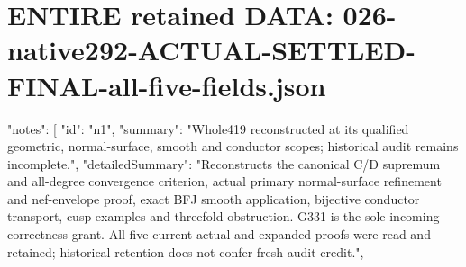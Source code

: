 \documentclass[11pt]{article}
\begin{document}
\section{ENTIRE retained DATA: 026-native292-ACTUAL-SETTLED-FINAL-all-five-fields.json}
\begin{Full422Data}
{
  "notes": [
    {
      "id": "n1",
      "summary": "Whole419 reconstructed at its qualified geometric, normal-surface, smooth and conductor scopes; historical audit remains incomplete.",
      "detailedSummary": "Reconstructs the canonical C/D supremum and all-degree convergence criterion, actual primary normal-surface refinement and nef-envelope proof, exact BFJ smooth application, bijective conductor transport, cusp examples and threefold obstruction. G331 is the sole incoming correctness grant. All five current actual and expanded proofs were read and retained; historical retention does not confer fresh audit credit.",
}}
\end{Full422Data}
\end{document}
